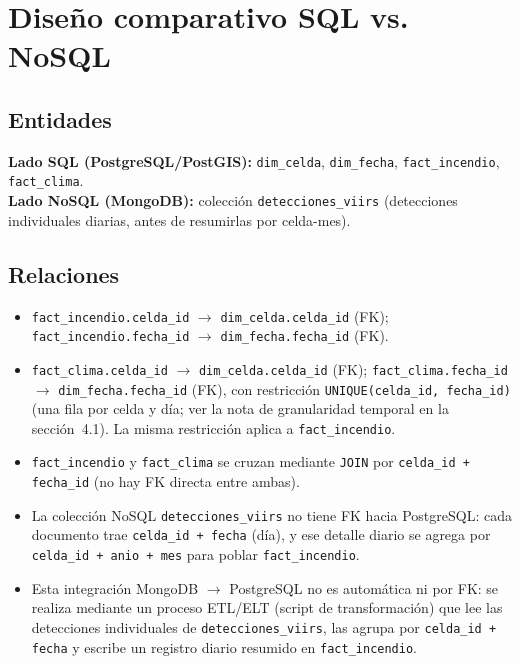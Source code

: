 \documentclass[11pt,a4paper]{article}
\begin{document}
\section{Dise\~no comparativo SQL vs. NoSQL}

\subsection{Entidades}
\textbf{Lado SQL (PostgreSQL/PostGIS):} \texttt{dim\_celda}, \texttt{dim\_fecha}, \texttt{fact\_incendio}, \texttt{fact\_clima}.\\
\textbf{Lado NoSQL (MongoDB):} colecci\'on \texttt{detecciones\_viirs} (detecciones individuales diarias, antes de resumirlas por celda-mes).

\subsection{Relaciones}
\begin{itemize}
    \item \texttt{fact\_incendio.celda\_id} $\rightarrow$ \texttt{dim\_celda.celda\_id} (FK); \texttt{fact\_incendio.fecha\_id} $\rightarrow$ \texttt{dim\_fecha.fecha\_id} (FK).
    \item \texttt{fact\_clima.celda\_id} $\rightarrow$ \texttt{dim\_celda.celda\_id} (FK); \texttt{fact\_clima.fecha\_id} $\rightarrow$ \texttt{dim\_fecha.fecha\_id} (FK), con restricci\'on \texttt{UNIQUE(celda\_id, fecha\_id)} (una fila por celda y d\'ia; ver la nota de granularidad temporal en la secci\'on~4.1). La misma restricci\'on aplica a \texttt{fact\_incendio}.
    \item \texttt{fact\_incendio} y \texttt{fact\_clima} se cruzan mediante \texttt{JOIN} por \texttt{celda\_id + fecha\_id} (no hay FK directa entre ambas).
    \item La colecci\'on NoSQL \texttt{detecciones\_viirs} no tiene FK hacia PostgreSQL: cada documento trae \texttt{celda\_id + fecha} (d\'ia), y ese detalle diario se agrega por \texttt{celda\_id + anio + mes} para poblar \texttt{fact\_incendio}.
    \item Esta integraci\'on MongoDB $\to$ PostgreSQL no es autom\'atica ni por FK: se realiza mediante un proceso ETL/ELT (script de transformaci\'on) que lee las detecciones individuales de \texttt{detecciones\_viirs}, las agrupa por \texttt{celda\_id + fecha} y escribe un registro diario resumido en \texttt{fact\_incendio}.
\end{itemize}
\end{document}
